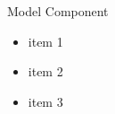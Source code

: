 \begin{frame}{Model Component}
	\begin{itemize}
		\item item 1
		\item item 2
		\item item 3
	\end{itemize}
\end{frame}
